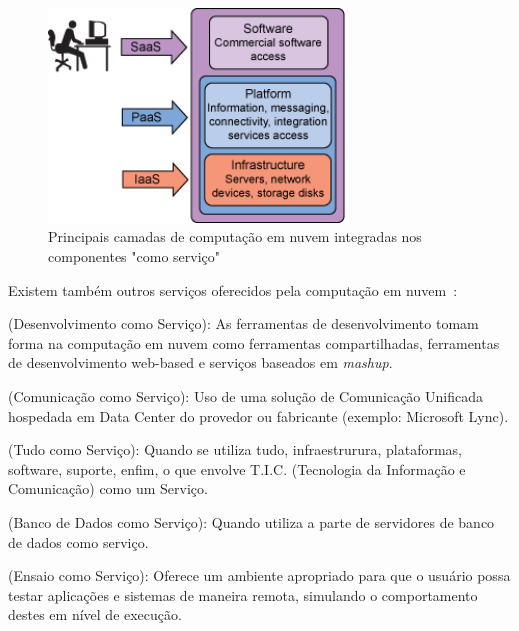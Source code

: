 \begin{figure}[H]
    \centering
    \includegraphics[width=0.7\textwidth]{img/layers.png}
    \caption{Principais camadas de computação em nuvem integradas nos componentes
        "como serviço"~\cite{cloud-computing-fundamentals}
    }
    \label{fig:layers}
\end{figure}


Existem também outros serviços oferecidos pela computação em 
nuvem~\cite{informatica}:

\begin{itemise}

     (Desenvolvimento como Serviço): As
    ferramentas de desenvolvimento tomam forma na computação em nuvem como
    ferramentas compartilhadas, ferramentas de desenvolvimento web-based e serviços
    baseados em \emph{mashup}. 

     (Comunicação como Serviço): Uso de uma
    solução de Comunicação Unificada hospedada em Data Center do provedor ou
    fabricante (exemplo: Microsoft Lync). 

     (Tudo como Serviço): Quando se utiliza
    tudo, infraestrurura, plataformas, software, suporte, enfim, o que envolve
    T.I.C. (Tecnologia da Informação e Comunicação) como um Serviço. 

     (Banco de Dados como Serviço): Quando
    utiliza a parte de servidores de banco de dados como serviço.

      (Ensaio como Serviço): Oferece um ambiente
    apropriado para que o usuário possa testar aplicações e sistemas de maneira
    remota, simulando o comportamento destes em nível de execução.

\end{itemise}


